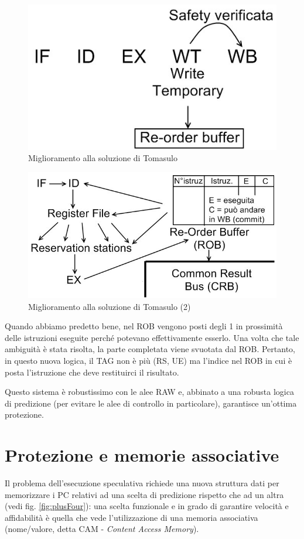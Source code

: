 \begin{figure}[!h]
\centering
\includegraphics[width=0.5\columnwidth]{img/safetyTomasulo}
\caption{Miglioramento alla soluzione di Tomasulo}
\label{fig:safetyTomasulo}
\end{figure}

\begin{figure}[!h]
\centering
\includegraphics[width=0.65\columnwidth]{img/safetyTomasulo2}
\caption{Miglioramento alla soluzione di Tomasulo (2)}
\label{fig:safetyTomasulo2}
\end{figure}

Quando abbiamo predetto bene, nel ROB vengono posti degli 1 in prossimità delle istruzioni eseguite perché potevano effettivamente esserlo. Una volta che tale ambiguità è stata risolta, la parte completata viene svuotata dal ROB.
Pertanto, in questo nuova logica, il TAG non è più (RS, UE) ma l'indice nel ROB in cui è posta l'istruzione che deve restituirci il risultato.

Questo sistema è robustissimo con le alee RAW e, abbinato a una robusta logica di predizione (per evitare le alee di controllo in particolare), garantisce un'ottima protezione. 

\section{Protezione e memorie associative}
\label{sec:memorieAssociative}

Il problema dell'esecuzione speculativa richiede una nuova struttura dati per memorizzare i PC relativi ad una scelta di predizione rispetto che ad un altra (vedi fig. \ref{fig:plusFour}): una scelta funzionale e in grado di garantire velocità e affidabilità è quella che vede l'utilizzazione di una memoria associativa (nome/valore, detta CAM - \textit{Content Access Memory}).

